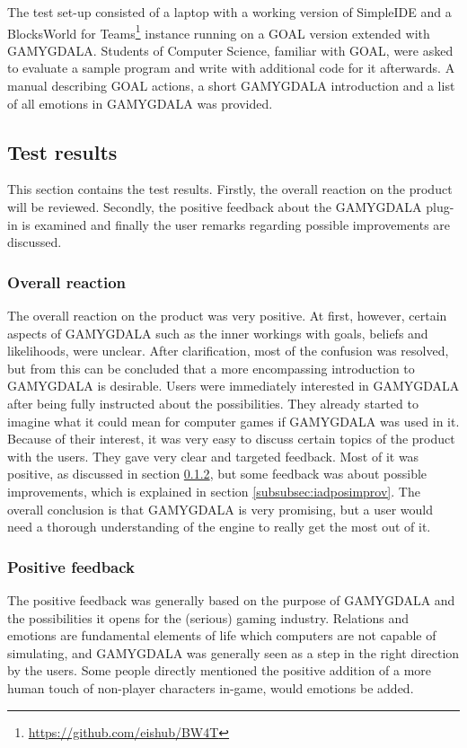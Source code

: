 The test set-up consisted of a laptop with a working version of SimpleIDE and a BlocksWorld for Teams\footnote{\url{https://github.com/eishub/BW4T}} instance running on a GOAL version extended with GAMYGDALA. Students of Computer Science, familiar with GOAL, were asked to evaluate a sample program and write with additional code for it afterwards. A manual describing GOAL actions, a short GAMYGDALA introduction and a list of all emotions in GAMYGDALA was provided.

\subsection{Test results}
\label{subsec:iadres}
This section contains the test results. Firstly, the overall reaction on the product will be reviewed. Secondly, the positive feedback about the GAMYGDALA plug-in is examined and finally the user remarks regarding possible improvements are discussed.

\subsubsection{Overall reaction}
The overall reaction on the product was very positive. At first, however, certain aspects of GAMYGDALA such as the inner workings with goals, beliefs and likelihoods, were unclear. After clarification, most of the confusion was resolved, but from this can be concluded that a more encompassing introduction to GAMYGDALA is desirable. Users were immediately interested in GAMYGDALA after being fully instructed about the possibilities. They already started to imagine what it could mean for computer games if GAMYGDALA was used in it. Because of their interest, it was very easy to discuss certain topics of the product with the users. They gave very clear and targeted feedback.  Most of it was positive, as discussed in section \ref{subsubsec:iadposfeedb}, but some feedback was about possible improvements, which is explained in section \ref{subsubsec:iadposimprov}. The overall conclusion is that GAMYGDALA is very promising, but a user would need a thorough understanding of the engine to really get the most out of it.

\subsubsection{Positive feedback}
\label{subsubsec:iadposfeedb}
The positive feedback was generally based on the purpose of GAMYGDALA and the possibilities it opens for the (serious) gaming industry. Relations and emotions are fundamental elements of life which computers are not capable of simulating, and GAMYGDALA was generally seen as a step in the right direction by the users. Some people directly mentioned the positive addition of a more human touch of non-player characters in-game, would emotions be added.\\

